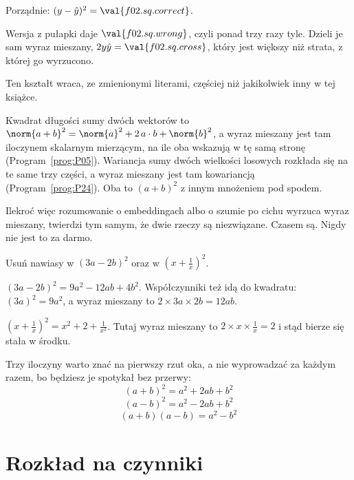 \begin{fr}
\begin{ansblock}
Porządnie: $(y - \hat{y})^{2} = \val{f02.sq.correct}$.

Wersja z pułapki daje $\val{f02.sq.wrong}$, czyli ponad trzy razy tyle.
Dzieli je sam wyraz mieszany, $2y\hat{y} = \val{f02.sq.cross}$, który jest
większy niż strata, z której go wyrzucono.
\end{ansblock}

\begin{aibox}
Ten kształt wraca, ze zmienionymi literami, częściej niż jakikolwiek inny w tej
książce.

Kwadrat długości sumy dwóch wektorów to
$\norm{a + b}^{2} = \norm{a}^{2} + 2\,a \cdot b + \norm{b}^{2}$, a wyraz
mieszany jest tam iloczynem skalarnym mierzącym, na ile oba wskazują w tę samą
stronę (Program~\ref{prog:P05}). Wariancja sumy dwóch wielkości losowych
rozkłada się na te same trzy części, a wyraz mieszany jest tam kowariancją
(Program~\ref{prog:P24}). Oba to $(a+b)^{2}$ z innym mnożeniem pod spodem.

Ilekroć więc rozumowanie o embeddingach albo o szumie po cichu wyrzuca wyraz
mieszany, twierdzi tym samym, że dwie rzeczy są niezwiązane. Czasem są. Nigdy
nie jest to za darmo.
\end{aibox}

\yourturn
Usuń nawiasy w $(3a - 2b)^{2}$ oraz w $\left(x + \frac{1}{x}\right)^{2}$.
\dotline
\nextframe
\end{fr}

\begin{fr}
\begin{ansblock}
$(3a - 2b)^{2} = 9a^{2} - 12ab + 4b^{2}$. Współczynniki też idą do kwadratu:
$(3a)^{2} = 9a^{2}$, a wyraz mieszany to $2 \times 3a \times 2b = 12ab$.

$\left(x + \frac{1}{x}\right)^{2} = x^{2} + 2 + \frac{1}{x^{2}}$. Tutaj wyraz
mieszany to $2 \times x \times \frac{1}{x} = 2$ i stąd bierze się stała w
środku.
\end{ansblock}

Trzy iloczyny warto znać na pierwszy rzut oka, a nie wyprowadzać za każdym
razem, bo będziesz je spotykał bez przerwy:
\[ (a+b)^{2} = a^{2} + 2ab + b^{2} \]
\[ (a-b)^{2} = a^{2} - 2ab + b^{2} \]
\[ (a+b)(a-b) = a^{2} - b^{2} \]
\end{fr}

\section{Rozkład na czynniki}
\label{sec:F02-factorising}

